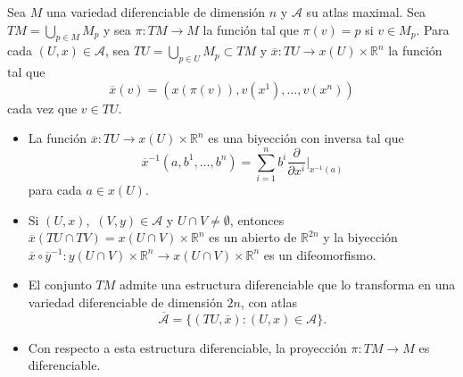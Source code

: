 \documentclass[11pt]{article}
\newcommand{\R}{\mathbb{R}}
\newcommand{\paint}[2]{\color{#1}{#2}}
\newcommand{\ol}{\overline}
\newenvironment{exercise}[2][Ejercicio]{\begin{trivlist}
\item[\hskip \labelsep \paint{red}{{\bfseries #1}}\hskip \labelsep {\bfseries #2.}]}{\end{trivlist}}
\begin{document}
\begin{exercise}{9} Sea $M$ una variedad diferenciable de dimensi\'on $n$ y $\mathcal{A}$ su atlas maximal. Sea $TM=\bigcup_{p\in M}M_{p}$ y sea $\pi :TM\to M$ la funci\'on tal
que $\pi (v)=p$ si $v\in M_{p}$. Para cada $(U,x)\in \mathcal{A}$, sea
$TU=\bigcup_{p\in U}M_{p}\subset TM$ y $\ol{x}:TU\to
x(U)\times \R^{n}$ la funci\'on tal que
  \[
  \ol{x}(v)=(x(\pi (v)),v(x^{1}),\dots ,v(x^{n}))
  \]
cada vez que $v\in TU$.
\begin{itemize}
\item[(a)] La funci\'on $\ol{x}:TU\to x(U)\times \R^{n}$ es una biyecci\'on
con inversa tal que
  \[
  \ol{x}^{-1}(a,b^{1},\dots,b^{n})
        = \sum_{i=1}^{n}b^{i}\frac{\partial}{\partial x^{i}}\Big|_{x^{-1}(a)}
  \]
para cada $a\in x(U).$

\item[(b)] Si $(U,x)$,~$(V,y)\in \mathcal{A}$ y $U\cap V\neq\emptyset$, entonces $\ol{x}(TU\cap
TV) = x(U\cap V)\times\R^{n}$ es un abierto de $\R^{2n}$ y 
la biyecci\'on $\ol{x}\circ \ol{y }^{-1}:y(U\cap V)\times\R^{n}\to x(U\cap V)\times 
\R^{n}$ es un difeomorfismo.

\item[(c)] El conjunto $TM$ admite una estructura diferenciable que lo transforma en
una variedad diferenciable de dimensi\'on $2n$, con atlas
  \[
  \ol{\mathcal{A}}=\{(TU,\ol{x}):(U,x)\in\mathcal{A}\}.
  \]

\item[(d)] Con respecto a esta estructura diferenciable, la proyecci\'on $\pi :TM\to M$ es diferenciable.
\end{itemize}
\end{exercise}
\end{document}
